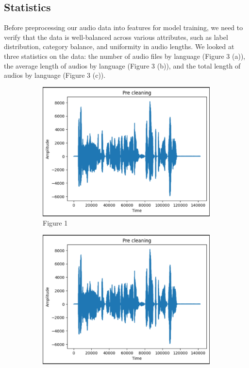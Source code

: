 \documentclass[twocolumn]{article}
\begin{document}
\subsection{Statistics}
Before preprocessing our audio data into features for model training, we need to verify that the data is well-balanced across various attributes, such as label distribution, category balance, and uniformity in audio lengths. We looked at three statistics on the data: the number of audio files by language (Figure 3 (a)), the average length of audios by language (Figure 3 (b)), and the total length of audios by language (Figure 3 (c)). 
\begin{figure}[h]
    \centering
    \begin{subfigure}[b]{0.3\textwidth}
        \centering
        \includegraphics[width=\linewidth]{images/pre_cleaning.png}
        \caption{Figure 1}
        \label{fig:image1}
    \end{subfigure}
    \hfill
    \begin{subfigure}[b]{0.3\textwidth}
        \centering
        \includegraphics[width=\linewidth]{images/pre_cleaning.png}

\end{subfigure}
\end{figure}
\end{document}
